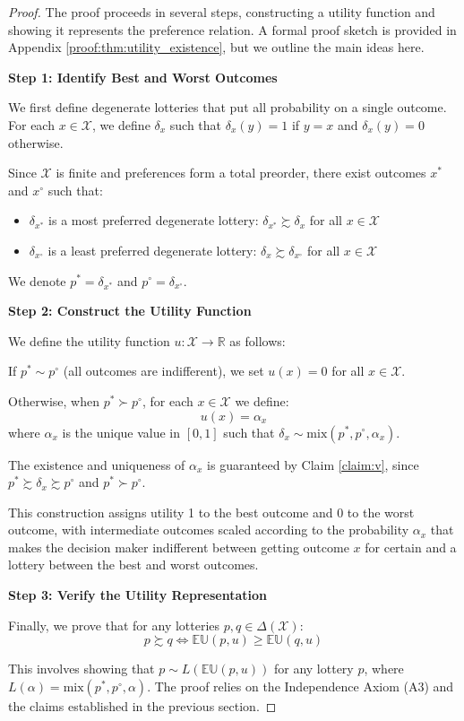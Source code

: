 \documentclass{article}
\theoremstyle{definition}
\newcommand{\R}{\mathbb{R}}
\newcommand{\X}{\mathcal{X}}
\newcommand{\EU}{\mathbb{EU}}
\newcommand{\DeltaX}{\Delta(\X)} %
\newcommand{\pref}{\succsim} %
\newcommand{\strictpref}{\succ} %
\newcommand{\indiff}{\sim} %
\newcommand{\mix}{\mathrm{mix}} %
\begin{document}
\begin{proof}
The proof proceeds in several steps, constructing a utility function and showing it represents the preference relation. A formal proof sketch is provided in Appendix \ref{proof:thm:utility_existence}, but we outline the main ideas here.

\textbf{Step 1: Identify Best and Worst Outcomes}

We first define degenerate lotteries that put all probability on a single outcome. For each $x \in \X$, we define $\delta_x$ such that $\delta_x(y) = 1$ if $y = x$ and $\delta_x(y) = 0$ otherwise.

Since $\X$ is finite and preferences form a total preorder, there exist outcomes $x^*$ and $x^\circ$ such that:
\begin{itemize}
    \item $\delta_{x^*}$ is a most preferred degenerate lottery: $\delta_{x^*} \pref \delta_x$ for all $x \in \X$
    \item $\delta_{x^\circ}$ is a least preferred degenerate lottery: $\delta_x \pref \delta_{x^\circ}$ for all $x \in \X$
\end{itemize}

We denote $p^* = \delta_{x^*}$ and $p^\circ = \delta_{x^\circ}$.

\textbf{Step 2: Construct the Utility Function}

We define the utility function $u: \X \to \R$ as follows:

If $p^* \indiff p^\circ$ (all outcomes are indifferent), we set $u(x) = 0$ for all $x \in \X$.

Otherwise, when $p^* \strictpref p^\circ$, for each $x \in \X$ we define:
\[ u(x) = \alpha_x \]
where $\alpha_x$ is the unique value in $[0, 1]$ such that $\delta_x \indiff \mix(p^*, p^\circ, \alpha_x)$.

The existence and uniqueness of $\alpha_x$ is guaranteed by Claim \ref{claim:v}, since $p^* \pref \delta_x \pref p^\circ$ and $p^* \strictpref p^\circ$.

This construction assigns utility 1 to the best outcome and 0 to the worst outcome, with intermediate outcomes scaled according to the probability $\alpha_x$ that makes the decision maker indifferent between getting outcome $x$ for certain and a lottery between the best and worst outcomes.

\textbf{Step 3: Verify the Utility Representation}

Finally, we prove that for any lotteries $p, q \in \DeltaX$:
\[ p \pref q \iff \EU(p, u) \ge \EU(q, u) \]

This involves showing that $p \indiff L(\EU(p,u))$ for any lottery $p$, where $L(\alpha) = \mix(p^*, p^\circ, \alpha)$. The proof relies on the Independence Axiom (A3) and the claims established in the previous section.
\end{proof}
\end{document}
